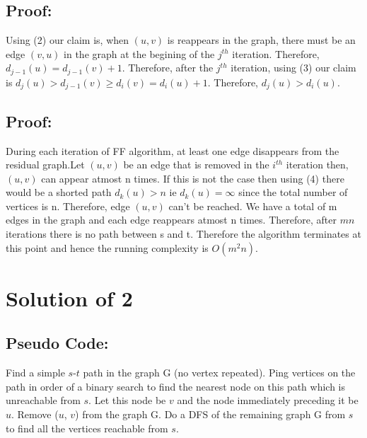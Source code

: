 \documentclass[a4paper,12pt]{article}
\begin{document}
\subsection{Proof:}
Using (2) our claim is, when $(u,v)$ is reappears in the graph, there must be an edge $(v,u)$ in the graph at the begining of the $j^{th}$ iteration. Therefore, $d_{j-1}(u)=d_{j-1}(v)+1$. Therefore, after the $j^{th}$ iteration, using (3) our claim is $d_j(u)>d_{j-1}(v)\geq d_{i}(v) = d_i(u)+1$. Therefore, $d_j(u)>d_i(u)$.
\subsection{Proof:}
During each iteration of FF algorithm, at least one edge disappears from the residual graph.Let $(u,v)$ be an edge that is removed in the $i^{th}$ iteration then, $(u,v)$ can appear atmost n times. If this is not the case then using (4) there would be a shorted path $d_k(u)>n$ ie $d_k(u)=\infty $ since the total number of vertices is n. Therefore, edge $(u,v)$ can't be reached. We have a total of m edges in the graph and each edge reappears atmost n times. Therefore, after $mn$ iterations there is no path between s and t. Therefore the algorithm terminates at this point and hence the running complexity is $O(m^2n)$.

\section{Solution of 2}
\subsection{Pseudo Code:}
\begin{algorithmic}
 \State Find a simple $s$-$t$ path in the graph G (no vertex repeated).
 \State Ping vertices on the path in order of a binary search to find the 
 \State nearest node on this path which is unreachable from $s$. Let this node
 \State be $v$ and the node immediately preceding it be $u$.
 \State Remove ($u$, $v$) from the graph G.
\EndWhile
\State Do a DFS of the remaining graph G from $s$ to find all the vertices
\State reachable from $s$.
\EndFunction
\end{algorithmic}
\end{document}
